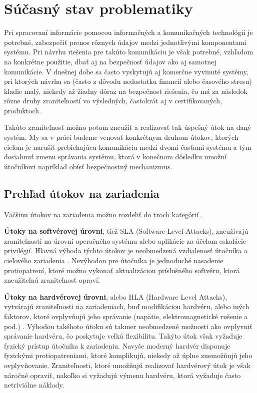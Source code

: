 \chapter{Súčasný stav problematiky}
\label{kap:stav}

Pri spracovaní informácie pomocou informačných a komunikačných technológií je potrebné, zabezpečiť prenos rôznych údajov medzi jednotlivými komponentami systému. Pri návrhu riešenia pre takúto komunikáciu je však potrebné, vzhľadom na konkrétne použitie, dbať aj na bezpečnosť údajov ako aj samotnej komunikácie. V dnešnej dobe sa často vyskytujú aj komerčne vyvinuté systémy, pri ktorých návrhu sa (často z dôvodu nedostatku financií alebo časového stresu) kladie malý, niekedy až žiadny dôraz na bezpečnosť riešenia, čo má za následok rôzne druhy zraniteľností vo výsledných, častokrát aj v certifikovaných, produktoch.

Takúto zraniteľnosť možno potom zneužiť a realizovať tak úspešný útok na daný systém. My sa v práci budeme venovať konkrétnym druhom útokov, ktorých cieľom je narušiť prebiehajúcu komunikáciu medzi dvomi časťami systému a tým dosiahnuť zmenu správania systému, ktorá v konečnom dôsledku umožní útočníkovi napríklad obísť bezpečnostný mechanizmus.

\section{Prehľad útokov na zariadenia} \label{kap1:sek:utoky}
Väčšinu útokov na zariadenia možno rozdeliť do troch kategórií \cite{mitmPCIe}.

\textbf{Útoky na softvérovej úrovni}, tiež SLA (Software Level Attacks), zneužívajú zraniteľnosti na úrovni operačného systému alebo aplikácie za účelom eskalácie privilégií. Hlavná výhoda týchto útokov je neobmedzená vzdialenosť útočníka a cieľového zariadenia \cite{mitmPCIe}. Nevýhodou pre útočníka je jednoduché nasadenie protiopatrení, ktoré možno vykonať aktualizáciou príslušného softvéru, ktorá zneužiteľnú zraniteľnosť opraví.

\textbf{Útoky na hardvérovej úrovni}, alebo HLA (Hardware Level Attacks), vytvárajú zraniteľnosti na zariadeniach, buď modifikáciou hardvéru, alebo iných faktorov, ktoré ovplyvňujú jeho správanie (napätie, elektromagnetické rušenie a pod.) \cite{mitmPCIe}. Výhodou takéhoto útoku sú takmer neobmedzené možnosti ako ovplyvniť správanie hardvéru, čo poskytuje veľkú flexibilitu. Takýto útok však vyžaduje fyzický prístup útočníka k zariadeniu. Navyše moderný hardvér disponuje fyzickými protiopatreniami, ktoré komplikujú, niekedy až úplne znemožňujú jeho ovplyvňovanie. Zraniteľnosti, ktoré umožňujú realizovať hardvérový útok je však náročné opraviť, nakoľko si vyžadujú výmenu hardvéru, ktorá vyžaduje často netriviálne náklady.

